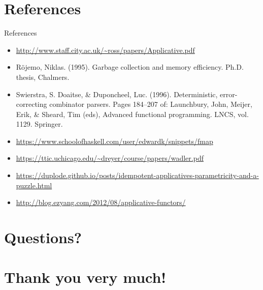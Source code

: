 \documentclass[presentation,aspectratio=169,smaller]{beamer}
\begin{document}
\section*{References}
\label{sec:org1310120}
\begin{frame}[label={sec:orgc9757da}]{References}
\begin{itemize}
\item \url{http://www.staff.city.ac.uk/\~ross/papers/Applicative.pdf}
\item Röjemo, Niklas. (1995). Garbage collection and memory efficiency. Ph.D.
thesis, Chalmers.
\item Swierstra, S. Doaitse, \& Duponcheel, Luc. (1996). Deterministic,
error-correcting combinator parsers. Pages 184–207 of: Launchbury, John,
Meijer, Erik, \& Sheard, Tim (eds), Advanced functional programming. LNCS,
vol. 1129. Springer.
\item \url{https://www.schoolofhaskell.com/user/edwardk/snippets/fmap}
\item \url{https://ttic.uchicago.edu/\~dreyer/course/papers/wadler.pdf}
\item \url{https://duplode.github.io/posts/idempotent-applicatives-parametricity-and-a-puzzle.html}
\item \url{http://blog.ezyang.com/2012/08/applicative-functors/}
\end{itemize}
\end{frame}

\section{Questions?}
\label{sec:orgcbcdbc2}

\section{Thank you very much!}
\label{sec:org15deead}
\end{document}

